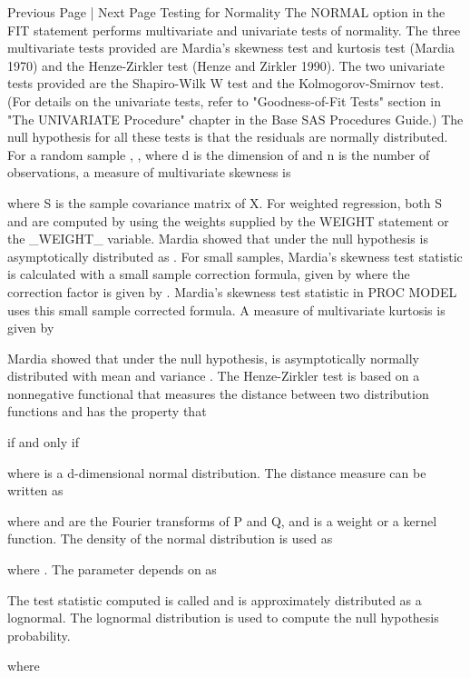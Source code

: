 
Previous Page | Next Page
Testing for Normality
The NORMAL option in the FIT statement performs multivariate and univariate tests of normality.
The three multivariate tests provided are Mardia’s skewness test and kurtosis test (Mardia 1970) and the Henze-Zirkler  test (Henze and Zirkler 1990). The two univariate tests provided are the Shapiro-Wilk W test and the Kolmogorov-Smirnov test. (For details on the univariate tests, refer to "Goodness-of-Fit Tests" section in "The UNIVARIATE Procedure" chapter in the Base SAS Procedures Guide.) The null hypothesis for all these tests is that the residuals are normally distributed.
For a random sample , , where d is the dimension of  and n is the number of observations, a measure of multivariate skewness is
 		 	 
where S is the sample covariance matrix of X. For weighted regression, both S and  are computed by using the weights supplied by the WEIGHT statement or the _WEIGHT_ variable.
Mardia showed that under the null hypothesis  is asymptotically distributed as . For small samples, Mardia’s skewness test statistic is calculated with a small sample correction formula, given by  where the correction factor  is given by . Mardia’s skewness test statistic in PROC MODEL uses this small sample corrected formula.
A measure of multivariate kurtosis is given by
 		 	 
Mardia showed that under the null hypothesis,  is asymptotically normally distributed with mean  and variance .
The Henze-Zirkler test is based on a nonnegative functional  that measures the distance between two distribution functions and has the property that
 		 	 
if and only if
 		 	 
where  is a d-dimensional normal distribution.
The distance measure  can be written as
 		 	 
where  and  are the Fourier transforms of P and Q, and  is a weight or a kernel function. The density of the normal distribution  is used as 
 		 	 
where .
The parameter  depends on  as
 		 	 
The test statistic computed is called  and is approximately distributed as a lognormal. The lognormal distribution is used to compute the null hypothesis probability.
 				 	 
 				 	 
where
 		 	 
